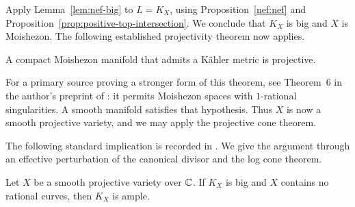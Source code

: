 Apply Lemma~\ref{lem:nef-big} to $L=K_X$, using Proposition~\ref{nef:nef} and
Proposition~\ref{prop:positive-top-intersection}.  We conclude that
$K_X$ is big and $X$ is Moishezon.  The following established
projectivity theorem now applies.

\begin{theorem}
\label{thm:moishezon-projectivity}
A compact Moishezon manifold that admits a K\"ahler metric is
projective.
\end{theorem}

For a primary source proving a stronger form of this theorem, see
Theorem~6 in the author's preprint of \cite{Namikawa2002}: it permits
Moishezon spaces with
$1$-rational singularities.  A smooth manifold satisfies that
hypothesis.  Thus $X$ is now a smooth projective variety, and we may
apply the projective cone theorem.

The following standard implication is recorded in
\cite[Lemma~2.1]{DiverioTrapani2019}. We give the argument through an
effective perturbation of the canonical divisor and the log cone
theorem.

\begin{proposition}
\label{prop:no-rational-ample}
Let $X$ be a smooth projective variety over $\mathbb C$.  If $K_X$ is big
and $X$ contains no rational curves, then $K_X$ is ample.
\end{proposition}

